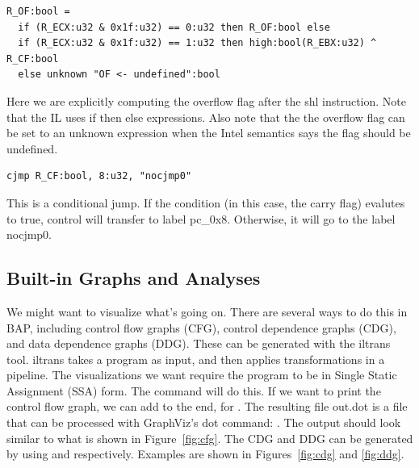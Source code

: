 \begin{verbatim}
R_OF:bool =
  if (R_ECX:u32 & 0x1f:u32) == 0:u32 then R_OF:bool else
  if (R_ECX:u32 & 0x1f:u32) == 1:u32 then high:bool(R_EBX:u32) ^ R_CF:bool
  else unknown "OF <- undefined":bool
\end{verbatim}
Here we are explicitly computing the overflow flag after the shl
instruction.  Note that the IL uses if then else expressions.  Also
note that the the overflow flag can be set to an unknown expression
when the Intel semantics says the flag should be undefined.

\begin{verbatim}
cjmp R_CF:bool, 8:u32, "nocjmp0"
\end{verbatim}
This is a conditional jump.  If the condition (in this case, the carry
flag) evalutes to true, control will transfer to label pc\_0x8.
Otherwise, it will go to the label nocjmp0.

\subsection{Built-in Graphs and Analyses}

We might want to visualize what's going on.  There are several ways to
do this in BAP, including control flow graphs (CFG), control
dependence graphs (CDG), and data dependence graphs (DDG).  These can
be generated with the iltrans tool.  iltrans takes a program as input,
and then applies transformations in a pipeline.  The visualizations we
want require the program to be in Single Static Assignment (SSA) form.
The command  will do this.  If
we want to print the control flow graph, we can add  to the end, for . The resulting file out.dot is a file that can be
processed with GraphViz's dot command: .  The output should look similar to what is shown in
Figure~\ref{fig:cfg}. The CDG and DDG can be generated by using
 and  respectively. Examples
are shown in Figures~\ref{fig:cdg} and \ref{fig:ddg}.

